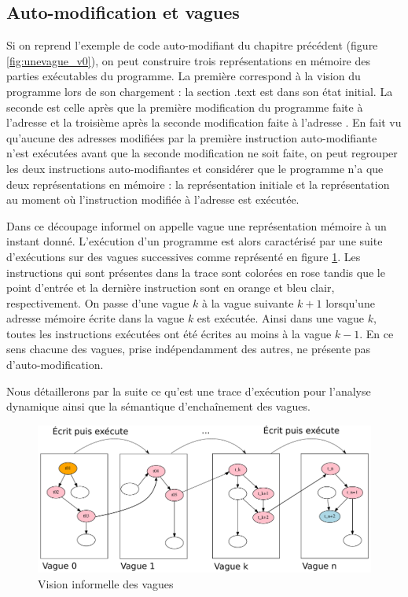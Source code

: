 \subsection{Auto-modification et vagues}
Si on reprend l'exemple de code auto-modifiant du chapitre précédent (figure \ref{fig:unevague_v0}), on peut construire trois représentations en mémoire des parties exécutables du programme.
La première correspond à la vision du programme lors de son chargement : la section .text est dans son état initial.
La seconde est celle après que la première modification du programme faite à l'adresse  et la troisième après la seconde modification faite à l'adresse .
En fait vu qu'aucune des adresses modifiées par la première instruction auto-modifiante n'est exécutées avant que la seconde modification ne soit faite, on peut regrouper les deux instructions auto-modifiantes et considérer que le programme n'a que deux représentations en mémoire : la représentation initiale et la représentation au moment où l'instruction modifiée à l'adresse  est exécutée.

Dans ce découpage informel on appelle vague une représentation mémoire à un instant donné. 
L'exécution d'un programme est alors caractérisé par une suite d'exécutions sur des vagues successives comme représenté en figure \ref{fig:vagues_visuel}. Les instructions qui sont présentes dans la trace sont colorées en rose tandis que le point d'entrée et la dernière instruction sont en orange et bleu clair, respectivement.
On passe d'une vague $k$ à la vague suivante $k+1$ lorsqu'une adresse mémoire écrite dans la vague $k$ est exécutée.
Ainsi dans une vague $k$, toutes les instructions exécutées ont été écrites au moins à la vague $k-1$. 
En ce sens chacune des vagues, prise indépendamment des autres, ne présente pas d'auto-modification.

Nous détaillerons par la suite ce qu'est une trace d'exécution pour l'analyse dynamique ainsi que la sémantique d'enchaînement des vagues.

\begin{figure}
 \includegraphics[width=1.0\textwidth]{supports/automodification/phases2_final.pdf}
 \caption{Vision informelle des vagues}
 \label{fig:vagues_visuel}
\end{figure}


